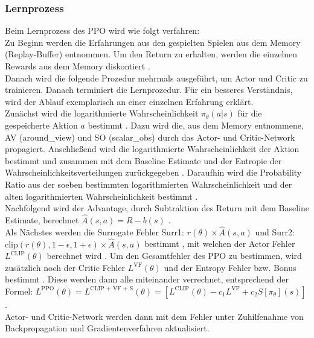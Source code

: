 \subsubsection{Lernprozess} \label{subsubsec:Konzept_Lernprozess_PPO}
Beim Lernprozess des PPO wird wie folgt verfahren:\\
Zu Beginn werden die Erfahrungen aus den gespielten Spielen aus dem Memory (Replay-Buffer) entnommen.
Um den Return zu erhalten, werden die einzelnen Rewards aus dem Memory diskontiert .\\
Danach wird die folgende Prozedur mehrmals ausgeführt, um Actor und Critic zu trainieren. Danach terminiert die Lernprozedur.
Für ein besseres Verständnis, wird der Ablauf exemplarisch an einer einzelnen Erfahrung erklärt.\\
Zunächst wird die logarithmierte Wahrscheinlichkeit $\pi_{\theta}(a|s)$ für die gespeicherte Aktion $a$ bestimmt . Dazu wird die, aus dem Memory entnommene, AV (around\_view) und SO (scalar\_obs) durch das Actor- und Critic-Network propagiert. Anschließend wird die logarithmierte Wahrscheinlichkeit der Aktion bestimmt und zusammen mit dem Baseline Estimate  und der Entropie der Wahrscheinlichkeitsverteilungen zurückgegeben .
Daraufhin wird die Probability Ratio aus der soeben bestimmten logarithmierten Wahrscheinlichkeit und der alten logarithmierten Wahrscheinlichkeit bestimmt .\\
Nachfolgend wird der Advantage, durch Subtraktion des Return mit dem Baseline Estimate, berechnet $\hat{A}(s, a) = R - b(s)$ .\\
Als Nächstes werden die Surrogate Fehler Surr1: $r(\theta) \times \hat{A}(s, a)$ und 
Surr2: $\text{clip}(r(\theta), 1 - \epsilon, 1 + \epsilon) \times \hat{A}(s, a)$ bestimmt , mit welchen der Actor Fehler $L^\text{CLIP} (\theta)$ berechnet wird .
Um den Gesamtfehler des PPO zu bestimmen, wird zusätzlich noch der Critic Fehler $L^{\text{VF}} (\theta)$  und der Entropy Fehler bzw. Bonus bestimmt . Diese werden dann alle miteinander verrechnet, entsprechend der Formel: 
$L^\text{PPO} (\theta) = L^\text{CLIP + VF + S} (\theta) = [L^{\text{CLIP}} (\theta) - c_{1}L^{\text{VF}} + c_{2}S[\pi_{\theta}](s)]$ .\\
Actor- und Critic-Network werden dann mit dem Fehler unter Zuhilfenahme von Backpropagation und Gradientenverfahren aktualisiert.

